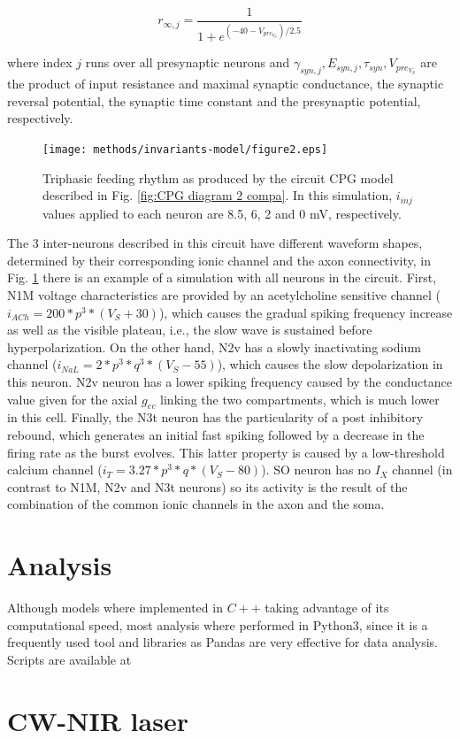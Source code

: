 \begin{equation}
	r_{\infty,j}=\frac{1}{1+e^{(-40-V_{pre_{V_S}})/2.5}}
	\label{eq:syn2}
\end{equation}


\noindent where index $j$ runs over all presynaptic neurons and \(\gamma_{syn,j}, E_{syn,j},\tau_{syn},V_{pre_{V_S}}\) are the product of input resistance and maximal synaptic conductance, the synaptic reversal potential, the synaptic time constant and the presynaptic potential, respectively. 


\begin{figure}[h!]
	\centering
	\texttt{[image: methods/invariants-model/figure2.eps]}
	\caption{Triphasic feeding rhythm as produced by the circuit CPG model described in Fig. \ref{fig:CPG diagram 2 compa}. In this simulation, $i_{inj}$ values applied to each neuron are 8.5, 6, 2 and 0 mV, respectively.}
	\label{fig:model simulation}
\end{figure}

The 3 inter-neurons described in this circuit have different waveform shapes, determined by their corresponding ionic channel and the axon connectivity, in Fig. \ref{fig:model simulation}   there is an example of a simulation with all neurons in the circuit. First, N1M voltage characteristics are provided by an acetylcholine sensitive channel (\(i_{ACh} = 200 * p^3 * (V_S + 30)\)), which causes the gradual spiking frequency increase as well as the visible plateau, i.e., the slow wave is sustained before hyperpolarization. On the other hand, N2v has a slowly inactivating sodium channel (\(i_{NaL} = 2 * p^3 * q^3 * (V_S-55)\)), which causes the slow depolarization in this neuron. N2v neuron has a lower spiking frequency caused by the conductance value given for the axial $g_{ec}$ linking the two compartments, which is much lower in this cell. Finally, the N3t neuron has the particularity of a post inhibitory rebound, which generates an initial fast spiking followed by a decrease in the firing rate as the burst evolves. This latter property is caused by a low-threshold calcium channel (\( i_T = 3.27 * p^3 * q *(V_S-80)\)). SO neuron has no \(I_X\) channel (in contrast to N1M, N2v and N3t neurons) so its activity is the result of the combination of the common ionic channels in the axon and the soma.

 
\section{Analysis}
Although models where implemented in $C++$ taking advantage of its computational speed, most analysis where performed in Python3, since it is a frequently used tool and libraries as Pandas are very effective for data analysis. 
Scripts are available at 

\section{CW-NIR laser}
%